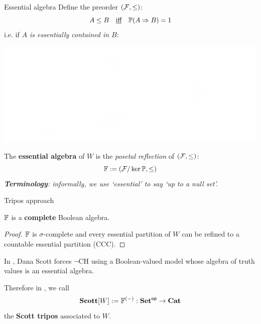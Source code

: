 \begin{frame}{Essential algebra}
	Define the preorder $(\mathcal{F}, \leq)$:
	\begin{equation*}
		A \leq B \quad\text{\underline{iff}}\quad \mathbb{P}(A \Rightarrow B) = 1
	\end{equation*}
	i.e. if \textit{$A$ is essentially contained in $B$}:

	\begin{center}
		\includegraphics[width=.5\columnwidth]{figures/essential-inclusion.png}
	\end{center}

	The \textbf{essential algebra} of $W$ is the \textit{posetal reflection} of $(\mathcal{F}, \leq)$:
	\begin{equation*}
		\mathbb{F} := (\mathcal{F} / \ker \mathbb{P}, \leq)
	\end{equation*}
	\textit{\textbf{Terminology}: informally, we use `essential' to say `up to a null set'.}
\end{frame}

\begin{frame}{Tripos approach}
	\begin{theorem}
		$\mathbb{F}$ is a \textbf{complete} Boolean algebra.
	\end{theorem}
	\begin{proof}
		$\mathbb{F}$ is $\sigma$-complete and every essential partition of $W$ can be refined to a countable essential partition (CCC).
	\end{proof}
	\vfill

	In \cite{scott1967proof}, Dana Scott forces $\neg$CH using a Boolean-valued model whose algebra of truth values is an essential algebra.

	Therefore in \cite{capucci2020internal}, we call
	\begin{equation*}
		\mathbf{Scott}[W] := \mathbb{F}^{(-)} : \mathbf{Set}^{\mathsf{op}} \to \mathbf{Cat}
	\end{equation*}
	the \textbf{Scott tripos} associated to $W$.
\end{frame}


